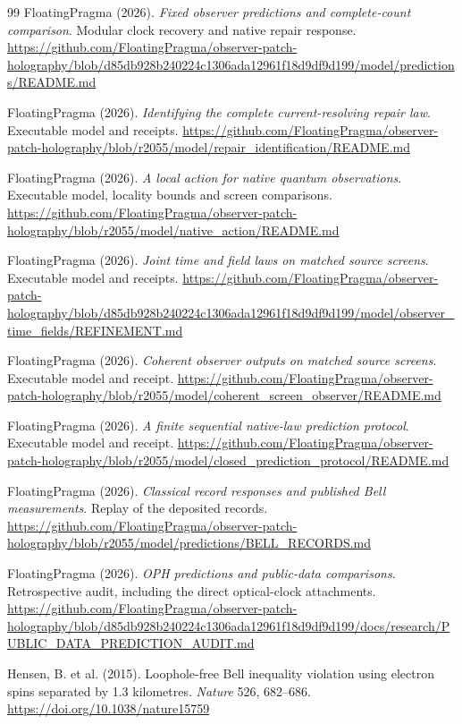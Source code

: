 \documentclass[11pt]{article}
\theoremstyle{definition}
\theoremstyle{remark}
\theoremstyle{plain}
\begin{document}
{\begin{thebibliography}{99}
FloatingPragma (2026). \emph{Fixed observer predictions and complete-count
comparison}. Modular clock recovery and native repair response.
\url{https://github.com/FloatingPragma/observer-patch-holography/blob/d85db928b240224c1306ada12961f18d9df9d199/model/predictions/README.md}

FloatingPragma (2026). \emph{Identifying the complete current-resolving
repair law}. Executable model and receipts.
\url{https://github.com/FloatingPragma/observer-patch-holography/blob/r2055/model/repair_identification/README.md}

FloatingPragma (2026). \emph{A local action for native quantum
observations}. Executable model, locality bounds and screen comparisons.
\url{https://github.com/FloatingPragma/observer-patch-holography/blob/r2055/model/native_action/README.md}

FloatingPragma (2026). \emph{Joint time and field laws on matched source
screens}. Executable model and receipts.
\url{https://github.com/FloatingPragma/observer-patch-holography/blob/d85db928b240224c1306ada12961f18d9df9d199/model/observer_time_fields/REFINEMENT.md}

FloatingPragma (2026). \emph{Coherent observer outputs on matched source
screens}. Executable model and receipt.
\url{https://github.com/FloatingPragma/observer-patch-holography/blob/r2055/model/coherent_screen_observer/README.md}

FloatingPragma (2026). \emph{A finite sequential native-law prediction
protocol}. Executable model and receipt.
\url{https://github.com/FloatingPragma/observer-patch-holography/blob/r2055/model/closed_prediction_protocol/README.md}

FloatingPragma (2026). \emph{Classical record responses and published Bell
measurements}. Replay of the deposited records.
\url{https://github.com/FloatingPragma/observer-patch-holography/blob/r2055/model/predictions/BELL_RECORDS.md}

FloatingPragma (2026). \emph{OPH predictions and public-data comparisons}.
Retrospective audit, including the direct optical-clock attachments.
\url{https://github.com/FloatingPragma/observer-patch-holography/blob/d85db928b240224c1306ada12961f18d9df9d199/docs/research/PUBLIC_DATA_PREDICTION_AUDIT.md}

Hensen, B. et al. (2015). Loophole-free Bell inequality violation using
electron spins separated by 1.3 kilometres. \emph{Nature} 526, 682--686.
\url{https://doi.org/10.1038/nature15759}


\end{thebibliography}}
\end{document}
